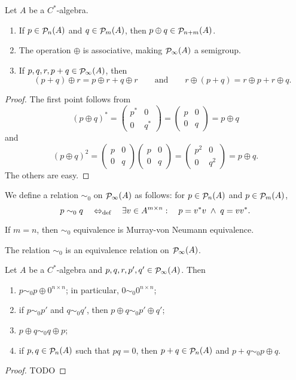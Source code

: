 \begin{lemma}
Let $A$ be a $C^*$-algebra.
\begin{enumerate}
\item If $p\in\mathop{\mathcal{P}}\nolimits_n(A)$ and $q\in\mathop{\mathcal{P}}\nolimits_m(A)$, then $p\oplus q\in\mathop{\mathcal{P}}\nolimits_{n+m}(A)$.
\item The operation $\oplus$ is associative, making $\mathop{\mathcal{P}}\nolimits_\infty(A)$ a semigroup.
\item If $p,q,r, p+q\in\mathop{\mathcal{P}}\nolimits_\infty(A)$, then
\[ (p+q)\oplus r = p\oplus r + q\oplus r \qquad \text{and} \qquad r\oplus(p+q) = r\oplus p +r\oplus q. \]
\end{enumerate}
\end{lemma}
\begin{proof}
The first point follows from
\[ (p\oplus q)^* = \begin{pmatrix}
p^* & 0 \\ 0 & q^*
\end{pmatrix} = \begin{pmatrix}
p & 0 \\ 0 & q
\end{pmatrix} = p\oplus q \]
and
\[ (p\oplus q)^2 = \begin{pmatrix}
p & 0 \\ 0 & q
\end{pmatrix}\begin{pmatrix}
p & 0 \\ 0 & q
\end{pmatrix} = \begin{pmatrix}
p^2 & 0 \\ 0 & q^2
\end{pmatrix} = p\oplus q. \]
The others are easy.
\end{proof}

\begin{definition}
We define a relation $\sim_0$ on $\mathop{\mathcal{P}}\nolimits_\infty(A)$ as follows: for $p\in \mathop{\mathcal{P}}\nolimits_n(A)$ and $p\in \mathop{\mathcal{P}}\nolimits_m(A)$,
\[ p \sim_0 q \quad\Leftrightarrow_{\text{def}}\quad \exists v\in A^{m\times n}: \quad p = v^*v\;\land \; q = vv^*. \]
\end{definition}
If $m=n$, then $\sim_0$ equivalence is Murray-von Neumann equivalence.
\begin{lemma}
The relation $\sim_0$ is an equivalence relation on $\mathop{\mathcal{P}}\nolimits_\infty(A)$.
\end{lemma}

\begin{lemma} \label{sim0properties}
Let $A$ be a $C^*$-algebra and $p,q,r,p',q'\in \mathop{\mathcal{P}}\nolimits_\infty(A)$. Then
\begin{enumerate}
\item $p\sim_0 p\oplus 0^{n\times n}$; in particular, $0 \sim_0 0^{n\times n}$;
\item if $p\sim_0 p'$ and $q\sim_0 q'$, then $p\oplus q \sim_0 p'\oplus q'$;
\item $p\oplus q \sim_0 q\oplus p$;
\item if $p,q\in\mathop{\mathcal{P}}\nolimits_n(A)$ such that $pq = 0$, then $p+q\in\mathop{\mathcal{P}}\nolimits_n(A)$ and $p+q \sim_0 p\oplus q$.
\end{enumerate}
\end{lemma}
\begin{proof}
TODO
\end{proof}

